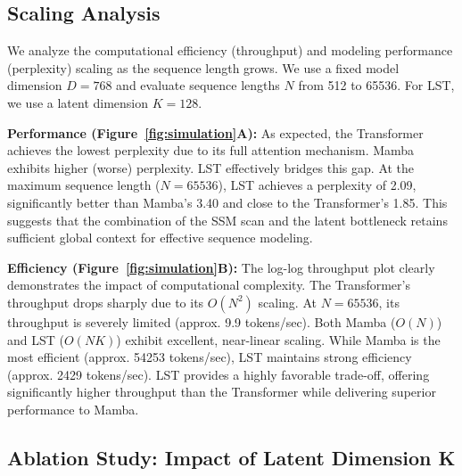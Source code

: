 \documentclass[10pt,twocolumn,letterpaper]{article}
\begin{document}
\subsection{Scaling Analysis}

We analyze the computational efficiency (throughput) and modeling performance (perplexity) scaling as the sequence length grows. We use a fixed model dimension \(D=768\) and evaluate sequence lengths \(N\) from 512 to 65536. For LST, we use a latent dimension \(K=128\).

\begin{figure*}[t]
\centering
\caption{Trade-off between perplexity (lower is better) and throughput (tokens/s, log-log scale) as sequence length grows. LST approaches Transformer-level perplexity while maintaining high efficiency with near-linear scaling, providing a favorable trade-off compared to both baselines. (Note: This figure is illustrative; the generating code is not provided in this version.)}
\label{fig:simulation}
\end{figure*}

\textbf{Performance (Figure~\ref{fig:simulation}A):} As expected, the Transformer achieves the lowest perplexity due to its full attention mechanism. Mamba exhibits higher (worse) perplexity. LST effectively bridges this gap. At the maximum sequence length (\(N=65536\)), LST achieves a perplexity of 2.09, significantly better than Mamba's 3.40 and close to the Transformer's 1.85. This suggests that the combination of the SSM scan and the latent bottleneck retains sufficient global context for effective sequence modeling.

\textbf{Efficiency (Figure~\ref{fig:simulation}B):} The log-log throughput plot clearly demonstrates the impact of computational complexity. The Transformer's throughput drops sharply due to its \(O(N^{2})\) scaling. At \(N=65536\), its throughput is severely limited (approx. 9.9 tokens/sec). Both Mamba (\(O(N)\)) and LST (\(O(NK)\)) exhibit excellent, near-linear scaling. While Mamba is the most efficient (approx. 54253 tokens/sec), LST maintains strong efficiency (approx. 2429 tokens/sec). LST provides a highly favorable trade-off, offering significantly higher throughput than the Transformer while delivering superior performance to Mamba.

\subsection{Ablation Study: Impact of Latent Dimension K}
\end{document}
